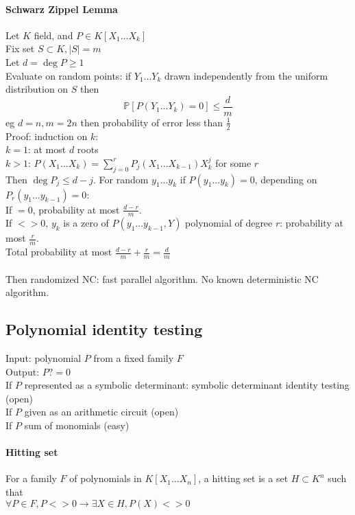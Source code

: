 \documentclass[12pt]{article}
\begin{document}
\paragraph{Schwarz Zippel Lemma\\}
Let $K$ field, and $P \in K[X_1 ... X_k]$\\
Fix set $S \subset K, |S| = m$\\
Let $d = \deg P \geqslant 1$\\
Evaluate on random points: if $Y_1 ... Y_k$ drawn independently from the uniform distribution on $S$ then
\[ \mathbb{P}[P(Y_1 ... Y_k) = 0] \leqslant \frac{d}{m} \]
eg $d=n, m=2n$ then probability of error less than $\frac{1}{2}$\\
Proof: induction on $k$:\\
$k=1$: at most $d$ roots\\
$k>1$: $P(X_1 ... X_k) = \sum_{j=0}^r P_j(X_1 ... X_{k-1})X_k^j$ for some $r$\\
Then $\deg P_j \leqslant d-j$. For random $y_1...y_k$ if $P(y_1 ... y_k) = 0$, depending on $P_r(y_1 ... y_{k-1}) = 0$:\\
If $=0$, probability at most $\frac{d-r}{m}$.\\
If $<>0$, $y_k$ is a zero of $P(y_1 ... y_{k-1}, Y)$ polynomial of degree $r$: probability at most $\frac{r}{m}$.\\
Total probability at most $\frac{d-r}{m} + \frac{r}{m} = \frac{d}{m}$\\\\

Then randomized NC: fast parallel algorithm. No known deterministic NC algorithm.\\

\subsection{Polynomial identity testing}
Input: polynomial $P$ from a fixed family $F$\\
Output: $P ?= 0$\\
If $P$ represented as a symbolic determinant: symbolic determinant identity testing (open)\\
If $P$ given as an arithmetic circuit (open)\\
If $P$ sum of monomials (easy)\\

\paragraph{Hitting set\\}
For a family $F$ of polynomials in $K[X_1 ... X_n]$, a hitting set is a set $H \subset K^n$ such that\\
$\forall P \in F, P <> 0 \rightarrow \exists X \in H, P(X) <> 0$\\
\end{document}

